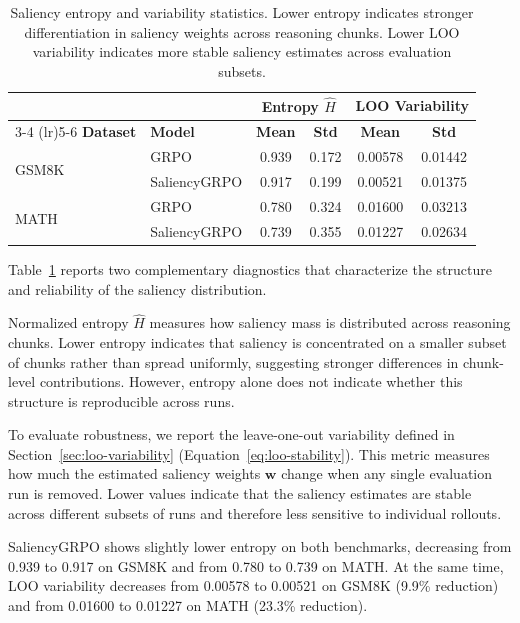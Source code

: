 \documentclass[12pt]{report}
\begin{document}
\begin{table}[t]
\centering
\caption{Saliency entropy and variability statistics. Lower entropy indicates stronger differentiation in saliency weights across reasoning chunks.
Lower LOO variability indicates more stable saliency estimates across evaluation subsets.}
\label{tab:entropy-stability}
\begin{tabular}{llcccc}
\toprule
& & \multicolumn{2}{c}{\textbf{Entropy $\hat{H}$}} & \multicolumn{2}{c}{\textbf{LOO Variability}} \\
\cmidrule(lr){3-4} \cmidrule(lr){5-6}
\textbf{Dataset} & \textbf{Model} & \textbf{Mean} & \textbf{Std} & \textbf{Mean} & \textbf{Std} \\
\midrule
\multirow{2}{*}{GSM8K}
  & GRPO          & 0.939 & 0.172 & 0.00578 & 0.01442 \\
  & SaliencyGRPO  & 0.917 & 0.199 & 0.00521 & 0.01375 \\
\midrule
\multirow{2}{*}{MATH}
  & GRPO          & 0.780 & 0.324 & 0.01600 & 0.03213 \\
  & SaliencyGRPO  & 0.739 & 0.355 & 0.01227 & 0.02634 \\
\bottomrule
\end{tabular}
\end{table}

Table~\ref{tab:entropy-stability} reports two complementary diagnostics that characterize the structure and reliability of the saliency distribution.

Normalized entropy $\hat{H}$ measures how saliency mass is distributed across reasoning chunks. Lower entropy indicates that saliency is concentrated on a smaller subset of chunks rather than spread uniformly, suggesting stronger differences in chunk-level contributions. However, entropy alone does not indicate whether this structure is reproducible across runs.

To evaluate robustness, we report the leave-one-out variability defined in Section~\ref{sec:loo-variability} (Equation~\ref{eq:loo-stability}). This metric measures how much the estimated saliency weights $\mathbf{w}$ change when any single evaluation run is removed. Lower values indicate that the saliency estimates are stable across different subsets of runs and therefore less sensitive to individual rollouts.

SaliencyGRPO shows slightly lower entropy on both benchmarks, decreasing from 0.939 to 0.917 on GSM8K and from 0.780 to 0.739 on MATH. At the same time, LOO variability decreases from 0.00578 to 0.00521 on GSM8K (9.9\% reduction) and from 0.01600 to 0.01227 on MATH (23.3\% reduction).
\end{document}
